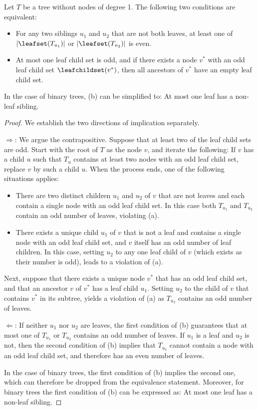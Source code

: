 \documentclass{toc}
\begin{document}
\begin{proposition}\label{prop:connectivity:equivalence}
Let $T$ be a tree without nodes of degree 1. The following two conditions are equivalent:
\begin{itemize}
\item[(a)] For any two siblings $u_1$ and $u_2$ that are not both leaves, at least one of $\lvert\leafset(T_{u_1})\rvert$ or $\lvert\leafset(T_{u_2})\rvert$ is even.
\item[(b)] At most one leaf child set is odd, and if there exists a node $v^*$ with an odd leaf child set $\leafchildset(v^*)$, then all ancestors of $v^*$ have an empty leaf child set.
\end{itemize}
In the case of binary trees, (b) can be simplified to: At most one leaf has a non-leaf sibling.
\end{proposition}
\begin{proof}
We establish the two directions of implication separately. 

\medskip

\noindent
$\Rightarrow$: We argue the contrapositive. Suppose that at least two of the leaf child sets are odd. Start with the root of $T$ as the node $v$, and iterate the following: If $v$ has a child $u$ such that $T_u$ contains at least two nodes with an odd leaf child set, replace $v$ by such a child $u$. When the process ends, one of the following situations applies:
\begin{itemize}
\item There are two distinct children $u_1$ and $u_2$ of $v$ that are not leaves and each contain a single node with an odd leaf child set. In this case both $T_{u_1}$ and $T_{u_2}$ contain an odd number of leaves, violating (a).
\item There exists a unique child $u_1$ of $v$ that is not a leaf and contains a single node with an odd leaf child set, and $v$ itself has an odd number of leaf children. In this case, setting $u_2$ to any one leaf child of $v$ (which exists as their number is odd), leads to a violation of (a).
\end{itemize} 
Next, suppose that there exists a unique node $v^*$ that has an odd leaf child set, and that an ancestor $v$ of $v^*$ has a leaf child $u_1$. Setting $u_2$ to the child of $v$ that contains $v^*$ in its subtree, yields a violation of (a) as $T_{u_2}$ contains an odd number of leaves.

\medskip

\noindent
$\Leftarrow$: If neither $u_1$ nor $u_2$ are leaves, the first condition of (b) guarantees that at most one of $T_{u_1}$ or $T_{u_2}$ contains an odd number of leaves. If $u_1$ is a leaf and $u_2$ is not, then the second condition of (b) implies that $T_{u_2}$ cannot contain a node with an odd leaf child set, and therefore has an even number of leaves.

\medskip

In the case of binary trees, the first condition of (b) implies the second one, which can therefore be dropped from the equivalence statement. Moreover, for binary trees the first condition of (b) can be expressed as: At most one leaf has a non-leaf sibling.
\end{proof}
\end{document}

